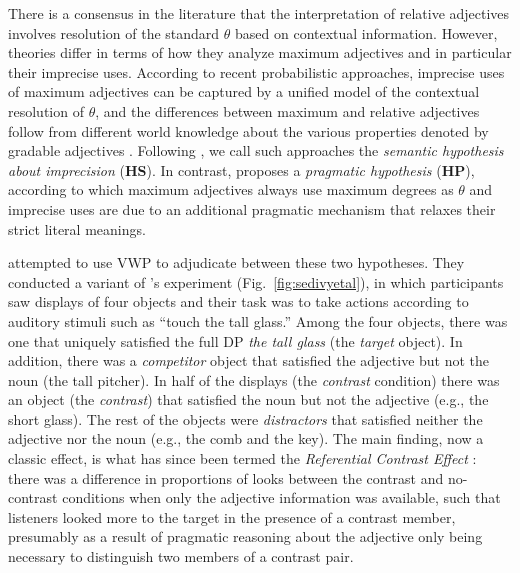 \documentclass[10pt,letterpaper]{article}
\begin{document}
There is a consensus in the literature that the interpretation of relative adjectives involves 
 resolution of the standard $\theta$ based on contextual information.
However, theories differ in terms of how they analyze maximum adjectives and in particular their imprecise uses. 
According to recent probabilistic approaches, imprecise uses of maximum adjectives can be captured by a unified 
 model of the contextual resolution of $\theta$, and the differences between maximum and relative adjectives
 follow from different world knowledge about the various properties denoted by gradable adjectives
 \cite{LassiterGoodman2013:Context-Scale-S,LassiterGoodman2015:Adjectival-vagu,QingFranke2014:Gradable-Adject,QingFranke2014:Meaning-and-Use}.
Following , we call such approaches the 
 \emph{semantic hypothesis about imprecision} (\textbf{HS}).
In contrast,  proposes a \emph{pragmatic hypothesis}
 (\textbf{HP}), according to which maximum adjectives always use maximum degrees as $\theta$ and 
 imprecise uses are due to an additional pragmatic mechanism that relaxes their strict literal meanings. 
 
 attempted to use VWP to adjudicate between these two hypotheses. 
They conducted a variant of \citeauthor{SedivyEtAl1999:Achieving-Incremental-Semantic-}'s
 \citeyear{SedivyEtAl1999:Achieving-Incremental-Semantic-} experiment  (Fig.~\ref{fig:sedivyetal}),  in which participants saw displays of four objects and 
 their task was to take actions according to auditory stimuli 
 such as ``touch the tall glass.''
Among the four objects, there was one that uniquely satisfied the full DP \emph{the tall glass}
(the \emph{target} object). 
In addition, there was a \emph{competitor} object that satisfied the adjective but not the noun 
 (the tall pitcher).
In half of the displays (the \emph{contrast} condition) there was an object (the \emph{contrast}) that satisfied the noun but not the adjective (e.g., the short glass). 
The rest of the objects were \emph{distractors} that satisfied neither the adjective nor the noun (e.g., the
 comb and the key). The main finding, now a classic effect, is what has since been termed the \emph{Referential Contrast Effect} \cite{Sedivy2003:Pragmatic-Versus-Form-}:  there was a difference in proportions of looks between the contrast and no-contrast conditions when only the adjective information was available, such that listeners looked more to the target in the presence of a contrast member, presumably as a result of pragmatic reasoning about the adjective only being necessary to distinguish two members of a contrast pair.
 
\end{document}
